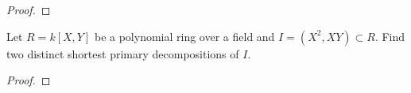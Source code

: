 \begin{proof}
\end{proof}
\newpage
\begin{problem}
Let $R=k[X,Y]$ be a polynomial ring over a field and
$I=(X^2,XY)\subset R$. Find two distinct shortest primary
decompositions of $I$.
\end{problem}
\begin{proof}
\end{proof}


